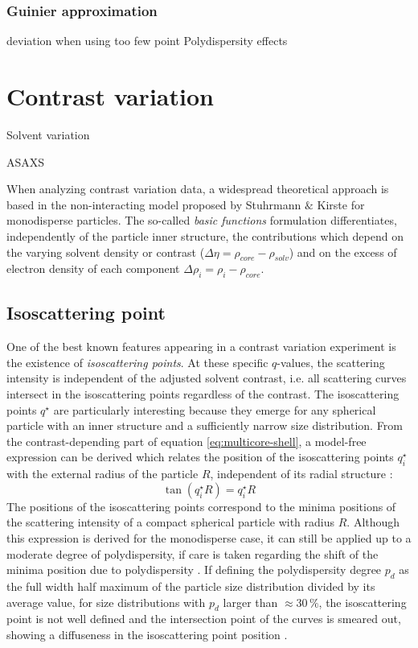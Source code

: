 \subsubsection{Guinier approximation}
deviation when using too few point
Polydispersity effects

\section{Contrast variation}
Solvent variation

ASAXS

When analyzing contrast variation data, a widespread theoretical approach is based in the non-interacting model proposed by Stuhrmann $\&$ Kirste \citeyear{stuhrmann_elimination_1965,stuhrmann_elimination_1967} for monodisperse particles. The so-called \emph{basic functions} formulation differentiates, independently of the particle inner structure, the contributions which depend on the varying solvent density or contrast (\(\Delta\eta=\rho_{core}-\rho_{solv}\)) and on the excess of electron density of each component \(\Delta \rho_i =\rho_i-\rho_{core}\). 
\subsection{Isoscattering point}
One of the best known features appearing in a contrast variation experiment is the existence of \emph{isoscattering points}. At these specific \( q\)-values, the scattering intensity is independent of the adjusted solvent contrast, i.e. all scattering curves intersect in the isoscattering points regardless of the contrast. The isoscattering points \(q^{\star}\) are particularly interesting because they emerge for any spherical particle with an inner structure and a sufficiently narrow size distribution. From the contrast-depending part of equation \eqref{eq:multicore-shell}, a model-free expression can be derived which relates the position of the isoscattering points \(q^{\star}_i\) with the external radius of the particle \( R \), independent of its radial structure \cite{kawaguchi_isoscattering_1992}:
\begin{equation}
\label{eq:isoscattering}
\tan(q^{\star}_iR)=q^{\star}_iR
\end{equation}
The positions of the isoscattering points correspond to the minima positions of the scattering intensity of a compact spherical particle with radius \( R \). Although this expression is derived for the monodisperse case, it can still be applied up to a moderate degree of polydispersity, if care is taken regarding the shift of the minima position due to polydispersity \cite{beurten_polydispersity_1981}. If defining the polydispersity degree \( p_d\) as the full width half maximum of the particle size distribution divided by its average value, for size distributions with \( p_d\) larger than \( \approx 30\,\% \), the isoscattering point is not well defined and the intersection point of the curves is smeared out, showing a diffuseness in the isoscattering point position \cite{kawaguchi_isoscattering_1992}.
